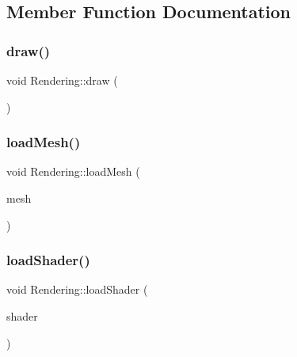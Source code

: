 \subsection{Member Function Documentation}
\hypertarget{class_mason_1_1_rendering_a6d279efe1ba558f425ab6bbdfa29ab48}{}\label{class_mason_1_1_rendering_a6d279efe1ba558f425ab6bbdfa29ab48} 
\subsubsection{\texorpdfstring{draw()}{draw()}}
{\footnotesize\ttfamily void Rendering\+::draw (\begin{DoxyParamCaption}{ }\end{DoxyParamCaption})}

\hypertarget{class_mason_1_1_rendering_ad27f8dd05e607f8503e0a102fa89d523}{}\label{class_mason_1_1_rendering_ad27f8dd05e607f8503e0a102fa89d523} 
\subsubsection{\texorpdfstring{load\+Mesh()}{loadMesh()}}
{\footnotesize\ttfamily void Rendering\+::load\+Mesh (\begin{DoxyParamCaption}\item[{std\+::shared\+\_\+ptr$<$ S\+R\+E\+::\+Mesh $>$}]{mesh }\end{DoxyParamCaption})}

\hypertarget{class_mason_1_1_rendering_a3ba4b1664ba76794b6efa266fdceab6c}{}\label{class_mason_1_1_rendering_a3ba4b1664ba76794b6efa266fdceab6c} 
\subsubsection{\texorpdfstring{load\+Shader()}{loadShader()}}
{\footnotesize\ttfamily void Rendering\+::load\+Shader (\begin{DoxyParamCaption}\item[{std\+::shared\+\_\+ptr$<$ S\+R\+E\+::\+Shader $>$}]{shader }\end{DoxyParamCaption})}

